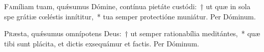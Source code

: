 \documentclass[vesperale_romanum.tex]{subfiles}
\begin{document}
\label{dom_5_pe}


\oratio

\lettrine{F}{a}míliam tuam, quǽsumus Dómine, contínua pietáte custódi:~† ut quæ in sola spe grátiæ cœléstis innítitur,~* tua semper prote\-ctióne muniátur.
Per Dóminum.

\label{dom_6_pe}


\oratio

\lettrine{P}{r}æsta, quǽsumus omnípotens Deus:~† ut semper rationabília meditántes,~* quæ tibi sunt plácita, et dictis exsequámur et factis. Per Dóminum.

\biggerrule
\end{document}
